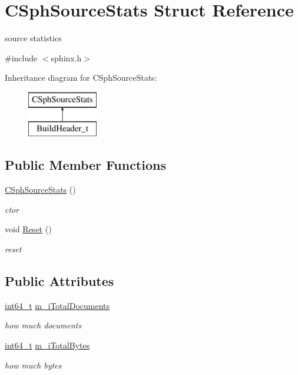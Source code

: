 \hypertarget{structCSphSourceStats}{\section{C\-Sph\-Source\-Stats Struct Reference}
\label{structCSphSourceStats}
}


source statistics  




{\ttfamily \#include $<$sphinx.\-h$>$}

Inheritance diagram for C\-Sph\-Source\-Stats\-:\begin{figure}[H]
\begin{center}
\leavevmode
\includegraphics[height=2.000000cm]{structCSphSourceStats}
\end{center}
\end{figure}
\subsection*{Public Member Functions}
\begin{DoxyCompactItemize}
\item 
\hyperlink{structCSphSourceStats_ad45de892d3a7bb01a437d1a36fbb79e5}{C\-Sph\-Source\-Stats} ()
\begin{DoxyCompactList}\small\item\em ctor \end{DoxyCompactList}\item 
void \hyperlink{structCSphSourceStats_af37a8e50f606110f0ccf7177caaf4fe8}{Reset} ()
\begin{DoxyCompactList}\small\item\em reset \end{DoxyCompactList}\end{DoxyCompactItemize}
\subsection*{Public Attributes}
\begin{DoxyCompactItemize}
\item 
\hyperlink{sphinxstd_8h_a996e72f71b11a5bb8b3b7b6936b1516d}{int64\-\_\-t} \hyperlink{structCSphSourceStats_ac75bd0c5deccaa20785431e1deb783db}{m\-\_\-i\-Total\-Documents}
\begin{DoxyCompactList}\small\item\em how much documents \end{DoxyCompactList}\item 
\hyperlink{sphinxstd_8h_a996e72f71b11a5bb8b3b7b6936b1516d}{int64\-\_\-t} \hyperlink{structCSphSourceStats_ad79043d3c012275d8d9fe91175e81d4f}{m\-\_\-i\-Total\-Bytes}
\begin{DoxyCompactList}\small\item\em how much bytes \end{DoxyCompactList}\end{DoxyCompactItemize}


